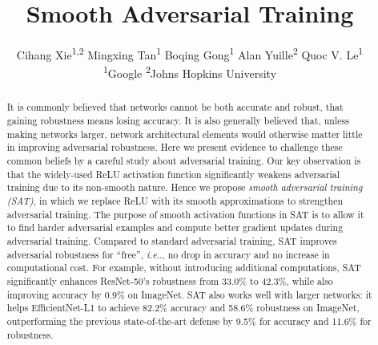 \documentclass{article}
\title{Smooth Adversarial Training}
\author{
Cihang Xie\textsuperscript{1,2}\footnotemark \quad
Mingxing Tan\textsuperscript{1} \quad
Boqing Gong\textsuperscript{1} \quad
Alan Yuille\textsuperscript{2} \quad
Quoc V. Le\textsuperscript{1} \vspace{.3em}\\
\textsuperscript{1}Google \qquad\qquad \textsuperscript{2}Johns Hopkins University
}
\makeatletter
\DeclareRobustCommand\onedot{\futurelet\@let@token\@onedot}
\def\@onedot{\ifx\@let@token.\else.\null\fi\xspace}
\def\ie{\emph{i.e}\onedot} \def\Ie{\emph{I.e}\onedot}
\makeatother
\begin{document}
\maketitle
 \renewcommand*{\thefootnote}{\fnsymbol{footnote}}
 \setcounter{footnote}{1}
 \renewcommand*{\thefootnote}{\arabic{footnote}}
 \setcounter{footnote}{0}
 
\maketitle


\begin{abstract}
It is commonly believed that networks cannot be both accurate and robust, that gaining robustness means  losing accuracy. It is also generally believed that, unless making networks larger, network architectural elements would otherwise matter little in improving adversarial robustness. Here we present evidence to challenge these common beliefs by a careful study about adversarial training. Our key observation is that the widely-used ReLU activation function significantly weakens adversarial training due to its non-smooth nature. Hence we propose \emph{smooth adversarial training (SAT)}, in which we replace ReLU with its smooth approximations to strengthen adversarial training. The purpose of smooth activation functions in SAT is to allow it to find harder adversarial examples and compute better gradient updates during adversarial training. Compared to standard adversarial training, SAT improves adversarial robustness for ``free'', \ie, no drop in accuracy and no increase in computational cost. For example, without introducing additional computations, SAT significantly enhances ResNet-50's robustness from 33.0\% to 42.3\%, while also improving  accuracy by 0.9\% on ImageNet. SAT also works well with larger networks:  it helps EfficientNet-L1 to achieve 82.2\%  accuracy and 58.6\% robustness on ImageNet, outperforming the previous state-of-the-art defense by 9.5\% for accuracy and 11.6\% for robustness.
\end{abstract}
\end{document}
